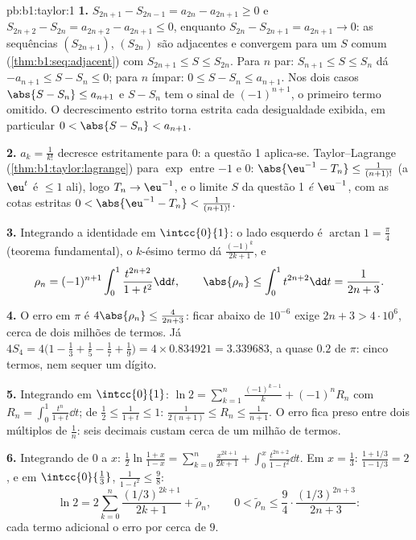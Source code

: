 \begin{solution}{pb:b1:taylor:1}
\textbf{1.} $S_{2n+1} - S_{2n-1} = a_{2n} - a_{2n+1} \geq 0$ e
$S_{2n+2} - S_{2n} = a_{2n+2} - a_{2n+1} \leq 0$, enquanto $S_{2n}
- S_{2n+1} = a_{2n+1} \to 0$: as sequências $(S_{2n+1})$,
$(S_{2n})$ são adjacentes e convergem para um $S$ comum
(\cref{thm:b1:seq:adjacent}) com $S_{2n+1} \leq S \leq S_{2n}$.
Para $n$ par: $S_{n+1} \leq S \leq S_n$ dá $-a_{n+1} \leq S -
S_n \leq 0$; para $n$ ímpar: $0 \leq S - S_n \leq a_{n+1}$. Nos dois
casos $\abs{S - S_n} \leq a_{n+1}$ e $S - S_n$ tem o sinal de
$(-1)^{n+1}$, o primeiro termo omitido. O decrescimento estrito torna
estrita cada desigualdade exibida, em particular $0 < \abs{S -
S_n} < a_{n+1}$.

\textbf{2.} $a_k = \frac{1}{k!}$ decresce estritamente para $0$:
a questão 1 aplica-se. Taylor--Lagrange
(\cref{thm:b1:taylor:lagrange}) para $\exp$ entre $-1$ e $0$:
$\abs{\eu^{-1} - T_n} \leq \frac{1}{(n+1)!}$ (a 
$\eu^t$ é $\leq 1$ ali), logo $T_n \to \eu^{-1}$, e o limite
$S$ da questão 1 \emph{é} $\eu^{-1}$, com as cotas estritas
$0 < \abs{\eu^{-1} - T_n} < \frac{1}{(n+1)!}$.

\textbf{3.} Integrando a identidade em $\intcc{0}{1}$: o
lado esquerdo é $\arctan 1 = \frac\pi4$ (teorema fundamental), o
$k$-ésimo termo dá $\frac{(-1)^k}{2k+1}$, e
\[
\rho_n = (-1)^{n+1}\int_0^1 \frac{t^{2n+2}}{1+t^2}\dd t,
\qquad
\abs{\rho_n} \leq \int_0^1 t^{2n+2}\dd t = \frac{1}{2n+3} .
\]

\textbf{4.} O erro em $\pi$ é $4\abs{\rho_n} \leq
\frac{4}{2n+3}$: ficar abaixo de $10^{-6}$ exige
$2n + 3 > 4\cdot10^6$, cerca de dois milhões de termos. Já $4S_4 = 4\bigl(1 - \frac13 +
\frac15 - \frac17 + \frac19\bigr) = 4 \times 0.834921 =
3.339683$, a quase $0.2$ de
$\pi$: cinco termos, nem sequer um dígito.

\textbf{5.} Integrando em $\intcc{0}{1}$: $\ln 2 =
\sum_{k=1}^{n} \frac{(-1)^{k-1}}{k} + (-1)^n R_n$ com $R_n =
\int_0^1 \frac{t^n}{1+t}\dd t$; de $\frac12 \leq \frac{1}{1+t}
\leq 1$: $\frac{1}{2(n+1)} \leq R_n \leq \frac{1}{n+1}$. O
erro fica preso entre dois múltiplos de $\frac1n$: seis
decimais custam cerca de um milhão de termos.

\textbf{6.} Integrando de $0$ a $x$: $\frac12\ln\frac{1 +
x}{1 - x} = \sum_{k=0}^{n} \frac{x^{2k+1}}{2k+1} + \int_0^x
\frac{t^{2n+2}}{1-t^2}\dd t$. Em $x = \frac13$: $\frac{1 +
1/3}{1 - 1/3} = 2$, e em
$\intcc{0}{\frac13}$, $\frac{1}{1 -
t^2} \leq \frac98$:
\[
\ln 2 = 2\sum_{k=0}^{n} \frac{(1/3)^{2k+1}}{2k+1} +
\tilde\rho_n,
\qquad
0 < \tilde\rho_n \leq \frac{9}{4}\cdot
\frac{(1/3)^{2n+3}}{2n+3} :
\]
cada termo adicional  o erro por cerca de $9$.


\end{solution}

